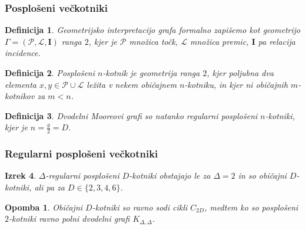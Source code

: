 \documentclass{beamer}
\newtheorem{izrek}{Izrek}
\newtheorem{definicija}[izrek]{Definicija}
\newtheorem{opomba}{Opomba}
\newcommand{\II}{\mathbf{I}}
\newcommand{\PP}{\mathcal{P}}
\newcommand{\LL}{\mathcal{L}}
\newcommand{\fig}[2]{%
  \begin{figure}
    \centering
    \resizebox{#1}{!}{{#2}}
  \end{figure}
}
\begin{document}
\begin{frame}
    \frametitle{Posplošeni večkotniki}
    \begin{definicija}
        Geometrijsko interpretacijo grafa formalno zapišemo kot geometrijo $\Gamma = (\PP, \LL, \II)$ 
        ranga $2$, kjer je $\PP$ množica točk, $\LL$ množica premic, $\II$ pa relacija incidence.
    \end{definicija}
    \begin{definicija}
        \emph{Posplošeni $n$-kotnik} je geometrija ranga $2$, kjer poljubna dva 
        elementa $x, y\in \PP\cup\LL$ ležita v nekem običajnem $n$-kotniku, in kjer ni običajnih
        $m$-kotnikov za $m < n$.
    \end{definicija}
    \begin{definicija}
        Dvodelni Mooreovi grafi so natanko regularni posplošeni $n$-kotniki, kjer je $n = \frac{g}{2} = D$.
    \end{definicija}
\end{frame}

\begin{frame}
    \frametitle{Regularni posplošeni večkotniki}
    \begin{izrek}
        $\Delta$-regularni posplošeni $D$-kotniki obstajajo le za $\Delta = 2$ in so običajni 
        $D$-kotniki, ali pa za $D\in\{2, 3, 4, 6\}$.
    \end{izrek}
    \begin{opomba}
        Običajni $D$-kotniki so ravno sodi cikli $C_{2D}$, medtem ko so 
        posplošeni $2$-kotniki ravno polni dvodelni grafi $K_{\Delta, \Delta}$.
        \fig{0.75\textwidth}{dvokotnik.tex}
    \end{opomba}
\end{frame}
\end{document}
